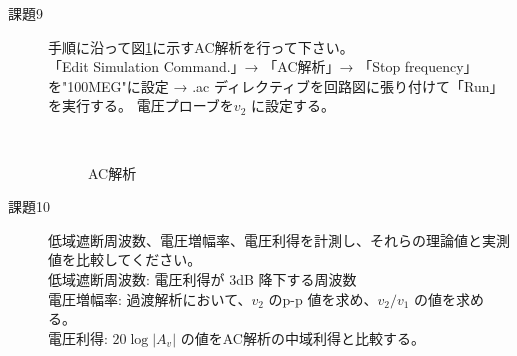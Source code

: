 \begin{description}
  \item[課題9] 手順に沿って図\ref{ackaiseki}に示すAC解析を行って下さい。\\
「Edit Simulation Command.」→ 「AC解析」→ 「Stop frequency」を"100MEG"に設定 → .ac ディレクティブを回路図に張り付けて「Run」を実行する。
電圧プローブを$v_2$ に設定する。

\begin{figure}[htb]
  \begin{center}
  ~
  \caption{AC解析}
  \label{ackaiseki}
  \end{center}
\end{figure}

  \item [課題10] 低域遮断周波数、電圧増幅率、電圧利得を計測し、それらの理論値と実測値を比較してください。\\
  低域遮断周波数: 電圧利得が 3dB 降下する周波数\\
  電圧増幅率: 過渡解析において、$v_2$ のp-p 値を求め、$v_2/v_1$ の値を求める。\\
  電圧利得: $20\log|A_v|$ の値をAC解析の中域利得と比較する。

\end{description}